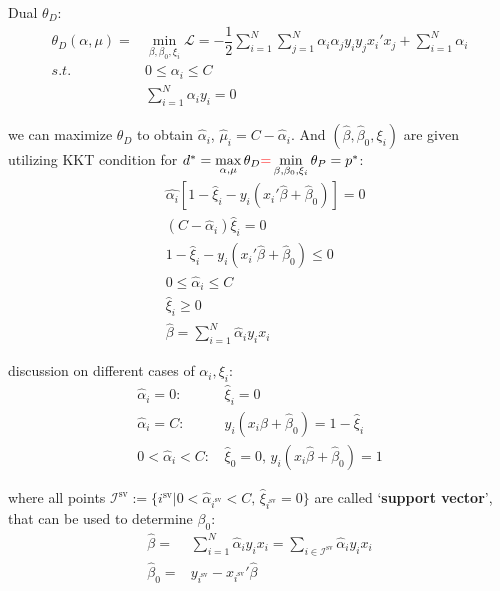    Dual $ \theta _D $:
\begin{align}\label{EqaDualProblemOfSVM}
    \theta _D(\alpha,\mu )=&\mathop{\min}\limits_{\beta ,\beta _0,\xi _i} \mathcal{L}=-\dfrac{1}{2}\sum_{i=1}^N\sum_{j=1}^N\alpha _i\alpha _jy_iy_jx_i'x_j+\sum_{i=1}^N\alpha _i\\
    s.t.\quad&0\leq \alpha _i\leq C\\
    &\sum_{i=1}^N\alpha _iy_i=0
\end{align}

    we can maximize $ \theta _D $ to obtain $ \hat{\alpha }_i $, $ \hat{\mu }_i=C-\hat{\alpha }_i $. And $ (\hat{\beta },\hat{\beta }_0,\xi _i) $ are given utilizing KKT condition for $ d^*=\mathop{\max}\limits_{\alpha ,\mu } \theta _D{\color{red}=}\mathop{\min}\limits_{\beta ,\beta _0,\xi _i}\theta _P=p^*  $:
\begin{align}
    &\hat{\alpha _i}\left[1-\hat{\xi }_i-y_i(x_i'\hat{\beta }+\hat{\beta }_0)\right]=0\\
    &(C-\hat{\alpha }_i)\hat{\xi }_i=0\\
    &1-\hat{\xi }_i-y_i(x_i'\hat{\beta }+\hat{\beta }_0)\leq 0\\
    &0\leq \hat{\alpha }_i\leq C\\
    &\hat{\xi }_i\geq 0\\
    &\hat{\beta }=\sum_{i=1}^N\hat{\alpha }_iy_ix_i
\end{align}

    discussion on different cases of $ \alpha _i,\xi _i $:
\begin{align}
    \hat{\alpha }_i=0:\,    &\hat{\xi }_i=0\\
    \hat{\alpha }_i=C:\,    &y_i(x_i\hat{\beta }+\hat{\beta }_0)=1-\hat{\xi }_i\\
    0<\hat{\alpha }_i<C:\,  &\hat{\xi }_0=0,\, y_i(x_i\hat{\beta }+\hat{\beta }_0)=1
\end{align}

    where all points $ \mathcal{I}^\mathrm{sv}:=  \{i^\mathrm{sv} \big|0<\hat{ \alpha }_{i^{\mathrm{sv} }}<C,\,\hat{\xi }_{i^\mathrm{sv} }=0 \} $ are called `\textbf{support vector}', that can be used to determine $ \beta _0 $:
\begin{align}
    \hat{\beta }=&\sum_{i=1}^N\hat{\alpha }_iy_ix_i=\sum_{i\in\mathcal{I}^\mathrm{sv} }\hat{\alpha }_iy_ix_i\\
    \hat{\beta }_0=&y_{i^\mathrm{sv} }-x_{i^\mathrm{sv} }'\hat{\beta }
\end{align}
    
